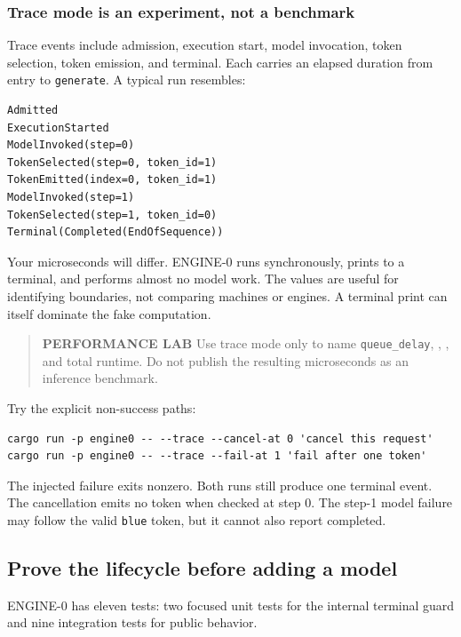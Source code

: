 \documentclass[
  10pt,
]{article}
\begin{document}
\subsubsection{Trace mode is an experiment, not a
benchmark}\label{trace-mode-is-an-experiment-not-a-benchmark}

Trace events include admission, execution start, model invocation, token
selection, token emission, and terminal. Each carries an elapsed
duration from entry to \texttt{generate}. A typical run resembles:

\begin{verbatim}
Admitted
ExecutionStarted
ModelInvoked(step=0)
TokenSelected(step=0, token_id=1)
TokenEmitted(index=0, token_id=1)
ModelInvoked(step=1)
TokenSelected(step=1, token_id=0)
Terminal(Completed(EndOfSequence))
\end{verbatim}

Your microseconds will differ. ENGINE-0 runs synchronously, prints to a
terminal, and performs almost no model work. The values are useful for
identifying boundaries, not comparing machines or engines. A terminal
print can itself dominate the fake computation.

\begin{quote}
\textbf{PERFORMANCE LAB} Use trace mode only to name
\texttt{queue\_delay}, \texttt{},
\texttt{}, and total runtime. Do not
publish the resulting microseconds as an inference benchmark.
\end{quote}

Try the explicit non-success paths:

\begin{verbatim}
cargo run -p engine0 -- --trace --cancel-at 0 'cancel this request'
cargo run -p engine0 -- --trace --fail-at 1 'fail after one token'
\end{verbatim}

The injected failure exits nonzero. Both runs still produce one terminal
event. The cancellation emits no token when checked at step 0. The
step-1 model failure may follow the valid \texttt{blue} token, but it
cannot also report completed.

\subsection{Prove the lifecycle before adding a
model}\label{prove-the-lifecycle-before-adding-a-model}

ENGINE-0 has eleven tests: two focused unit tests for the internal
terminal guard and nine integration tests for public behavior.
\end{document}
